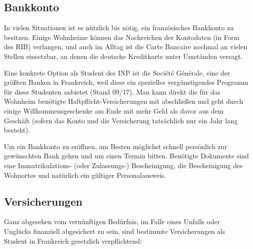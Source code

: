 \documentclass[11pt,a4paper]{article}
\begin{document}
	\subsection{Bankkonto}
	
	In vielen Situationen ist es nützlich bis nötig, ein französisches Bankkonto zu besitzen. Einige Wohnheime können das Nachreichen der Kontodaten (in Form des RIB) verlangen, und auch im Alltag ist die Carte Bancaire nochmal an vielen Stellen einsetzbar, an denen die deutsche Kreditkarte unter Umständen versagt.
	
	Eine konkrete Option als Student des INP ist die Société Générale, eine der größten Banken in Frankreich, weil diese ein spezielles vergünstigendes Programm für diese Studenten anbietet (Stand 09/17). Man kann direkt die für das Wohnheim benötigte Haftpflicht-Versicherungen mit abschließen und geht durch einige Willkommensgeschenke am Ende mit mehr Geld als davor aus dem Geschäft (sofern das Konto und die Versicherung tatsächlich nur ein Jahr lang besteht).
	
	Um ein Bankkonto zu eröffnen, am Besten möglichst schnell persönlich zur gewünschten Bank gehen und um einen Termin bitten. Benötigte Dokumente sind eine Immatrikulations- (oder Zulassungs-) Bescheinigung, die Bescheinigung des Wohnortes und natürlich ein gültiger Personalausweis.
	
	\subsection{Versicherungen}
	
	Ganz abgesehen vom vernünftigen Bedürfnis, im Falle eines Unfalls oder Unglücks finanziell abgesichert zu sein, sind bestimmte Versicherungen als Student in Frankreich gesetzlich verpflichtend:
	
\end{document}

